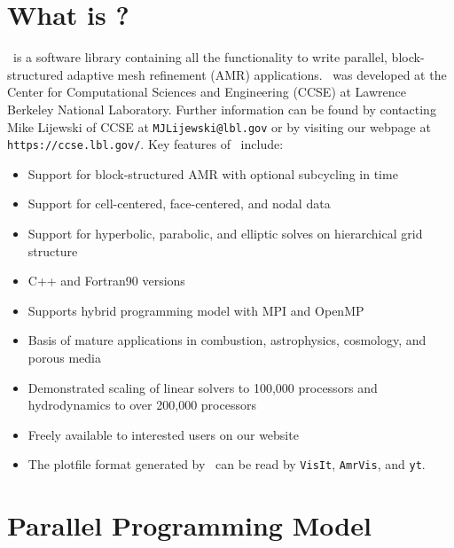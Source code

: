 \section{What is \BoxLib?}

\BoxLib\ is a software library containing all the functionality to write parallel, 
block-structured adaptive mesh refinement (AMR) applications.
\BoxLib\ was developed at the Center for Computational Sciences and Engineering (CCSE) at 
Lawrence Berkeley National Laboratory.  Further information can be found by contacting 
Mike Lijewski of CCSE at {\tt MJLijewski@lbl.gov} or by visiting our webpage
at {\tt https://ccse.lbl.gov/}.  Key features of \BoxLib\ include:

\begin{itemize}
\item Support for block-structured AMR with optional subcycling in time
\item Support for cell-centered, face-centered, and nodal data
\item Support for hyperbolic, parabolic, and elliptic solves on hierarchical grid structure
\item C++ and Fortran90 versions
\item Supports hybrid programming model with MPI and OpenMP
\item Basis of mature applications in combustion, astrophysics, cosmology, and porous media
\item Demonstrated scaling of linear solvers to 100,000 processors and 
      hydrodynamics to over 200,000 processors
\item Freely available to interested users on our website
\item The plotfile format generated by \BoxLib\ can be read by {\tt VisIt}, {\tt AmrVis},
      and {\tt yt}.
\end{itemize}

\section{Parallel Programming Model}

